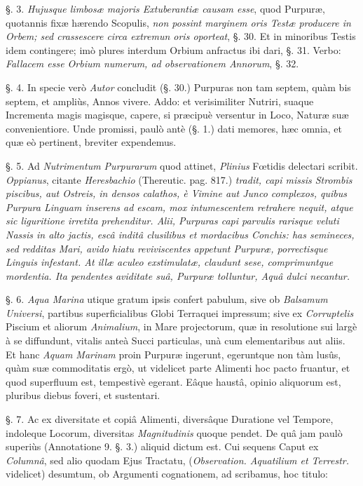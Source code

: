 \documentclass[a4paper, 11pt, oneside, polutonikogreek, german]{article}
\begin{document}
§. 3. \emph{Hujusque limbosæ majoris Extuberantiæ causam esse}, quod Purpuræ, quotannis fixæ hærendo Scopulis, \emph{non possint marginem oris Testæ producere in Orbem; sed crassescere circa extremun oris oporteat}, §. 30. Et in minoribus Testis idem contingere; imò plures interdum Orbium anfractus ibi dari, §. 31. Verbo: \emph{Fallacem esse Orbium numerum, ad observationem Annorum}, §. 32.

§. 4. In specie verò \emph{Autor} concludit (§. 30.) Purpuras non tam septem, quàm bis septem, et ampliùs, Annos vivere. Addo: et verisimiliter Nutriri, suaque Incrementa magis magisque, capere, si præcipuè versentur in Loco, Naturæ suæ convenientiore. Unde promissi, paulò antè (§. 1.) dati memores, hæc omnia, et quæ eò pertinent, breviter expendemus.

§. 5. Ad \emph{Nutrimentum Purpurarum} quod attinet, \emph{Plinius} Fœtidis delectari scribit. \emph{Oppianus}, citante \emph{Heresbachio} (Thereutic. pag. 817.) \emph{tradit, capi missis Strombis piscibus, aut Ostreis, in densos calathos, è Vimine aut Junco complexos, quibus Purpura Linguam inserens ad escam, mox intumescentem retrahere nequit, atque sic liguritione irretita prehenditur. Alii, Purpuras capi parvulis rarisque veluti Nassis in alto jactis, escâ inditâ clusilibus et mordacibus Conchis: has semineces, sed redditas Mari, avido hiatu reviviscentes appetunt Purpuræ, porrectisque Linguis infestant. At illæ aculeo exstimulatæ, claudunt sese, comprimuntque mordentia. Ita pendentes aviditate suâ, Purpuræ tolluntur, Aquâ dulci necantur.}

§. 6. \emph{Aqua Marina} utique gratum ipsis confert pabulum, sive ob \emph{Balsamum Universi}, partibus superficialibus Globi Terraquei impressum; sive ex \emph{Corruptelis} Piscium et aliorum \emph{Animalium}, in Mare projectorum, quæ in resolutione sui largè à se diffundunt, vitalis anteà Succi particulas, unà cum elementaribus aut aliis. Et hanc \emph{Aquam Marinam} proin Purpuræ ingerunt, egeruntque non tàm lusûs, quàm suæ commoditatis ergò, ut videlicet parte Alimenti hoc pacto fruantur, et quod superfluum est, tempestivè egerant. Eâque haustâ, opinio aliquorum est, pluribus diebus foveri, et sustentari.

§. 7. Ac ex diversitate et copiâ Alimenti, diversâque Duratione vel Tempore, indoleque Locorum, diversitas \emph{Magnitudinis} quoque pendet. De quâ jam paulò superiùs (Annotatione 9. §. 3.) aliquid dictum est. Cui sequens Caput ex \emph{Columnâ}, sed alio quodam Ejus Tractatu, (\emph{Observation. Aquatilium et Terrestr.} videlicet) desumtum, ob Argumenti cognationem, ad scribamus, hoc titulo:
\end{document}
